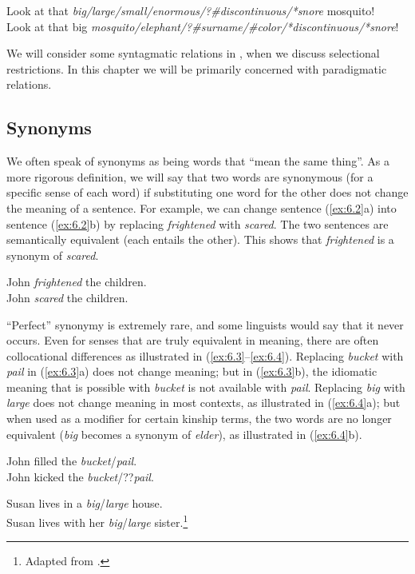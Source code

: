 \ea \label{ex:6.1}
\ea Look at that \textit{big/large/small/enormous/?\#discontinuous/*snore} mosquito!\\
\ex Look at that big \textit{mosquito/elephant/?\#surname/\#color/*discontinuous/*snore}!
                       \z
\z


We will consider some syntagmatic relations in , when we discuss selectional restrictions. In this chapter we will be primarily concerned with paradigmatic relations.


\subsection{Synonyms}\label{sec:6.2.1}

We often speak of synonyms as being words that “mean the same thing”. As a more rigorous definition, we will say that two words are synonymous (for a specific sense of each word) if substituting one word for the other does not change the meaning of a sentence. For example, we can change sentence (\ref{ex:6.2}a) into sentence (\ref{ex:6.2}b) by replacing \textit{frightened} with \textit{scared}. The two sentences are semantically equivalent (each entails the other). This shows that \textit{frightened} is a synonym of \textit{scared}.


\ea \label{ex:6.2}
\ea John \textit{frightened} the children.\\
\ex John \textit{scared} the children.
                       \z
\z


“Perfect” synonymy is extremely rare, and some linguists would say that it never occurs. Even for senses that are truly equivalent in meaning, there are often collocational differences as illustrated in (\ref{ex:6.3}--\ref{ex:6.4}). Replacing \textit{bucket} with \textit{pail} in (\ref{ex:6.3}a) does not change meaning; but in (\ref{ex:6.3}b), the idiomatic meaning that is possible with \textit{bucket} is not available with \textit{pail}. Replacing \textit{big} with \textit{large} does not change meaning in most contexts, as illustrated in (\ref{ex:6.4}a); but when used as a modifier for certain kinship terms, the two words are no longer equivalent (\textit{big} becomes a synonym of \textit{elder}), as illustrated in (\ref{ex:6.4}b).


\ea \label{ex:6.3}
\ea John filled the \textit{bucket}/\textit{pail}.\\
\ex John kicked the \textit{bucket}/??\textit{pail}.
                       \z
\z

\ea \label{ex:6.4}
\ea Susan lives in a \textit{big}/\textit{large} house.\\
\ex Susan lives with her \textit{big}/\textit{large} sister.\footnote{Adapted from \citet[66]{Saeed2009}.}
                       \z
\z

